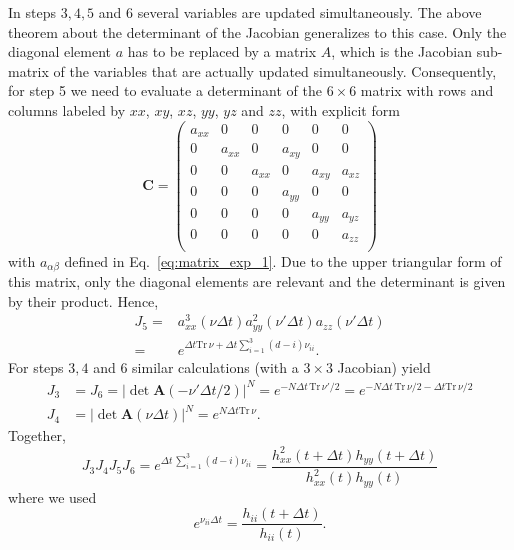 \documentclass[12pt,letter]{article}
\renewcommand{\vec}[1]{\mathbf{#1}}
\begin{document}
In steps $3,4,5$ and $6$ several variables are updated simultaneously.
The above theorem about the determinant of the Jacobian generalizes to this case. Only
the diagonal element $a$ has to be replaced by a matrix $A$, which is the Jacobian sub-matrix
of the variables that are actually updated simultaneously. Consequently, for step 5 we need to evaluate a determinant of the $6\times6$ matrix with rows and columns labeled by
$xx$, $xy$, $xz$, $yy$, $yz$ and $zz$, with explicit form
\begin{equation}
\vec C= \left(\begin{matrix}
a_{xx} &0 &0 &0 &0 &0 \\
0& a_{xx} &0 & a_{xy} &0 &0 \\
0& 0 & a_{xx} & 0 & a_{xy} & a_{xz}  \\
0 & 0 & 0 & a_{yy} & 0 & 0 \\
0 & 0 & 0 & 0 & a_{yy} & a_{yz} \\
0 & 0 & 0 & 0 & 0 & a_{zz} \\
\end{matrix}\right)
\end{equation}
with $a_{\alpha\beta}$ defined in Eq.~\eqref{eq:matrix_exp_1}. Due to the upper triangular form
of this matrix, only the diagonal elements are relevant and the determinant is given by their product.
Hence,
\begin{align}
J_5 =& a_{xx}^3(\nu \Delta t) a_{yy}^2(\nu' \Delta t) a_{zz}(\nu'\Delta t)\\
=& e^{\Delta t \mathrm{Tr}\,\nu +\Delta t \sum_{i=1}^3 (d-i) \nu_{ii}}.
\end{align}
For steps $3, 4$ and $6$ similar calculations (with a $3\times3$ Jacobian) yield
\begin{align}
J_3 &= J_6 =  |\det \vec A(-\nu' \Delta t/2)|^N = e^{-N\Delta t\, \mathrm{Tr}\, \nu'/2}=e^{-N \Delta t\, \mathrm{Tr}\,\nu/2 - \Delta t \mathrm{Tr}\,\nu/2}\\
J_4 &= |\det \vec A(\nu \Delta t)|^N = e^{N \Delta t \mathrm{Tr}\, \nu}.
\end{align}
Together,
\begin{equation}
J_3 J_4 J_5 J_6 = e^{\Delta t\,\sum_{i=1}^3 (d-i) \nu_{ii} } =
\frac{h^2_{xx}(t+\Delta t) h_{yy}(t+\Delta t)}{h^2_{xx}(t) h_{yy}(t)}\label{eq:jacobi_nu}
\end{equation}
where we used
\begin{equation}
e^{\nu_{ii} \Delta t} = \frac{h_{ii}(t+\Delta t)}{h_{ii}(t)}.
\end{equation}
\end{document}
